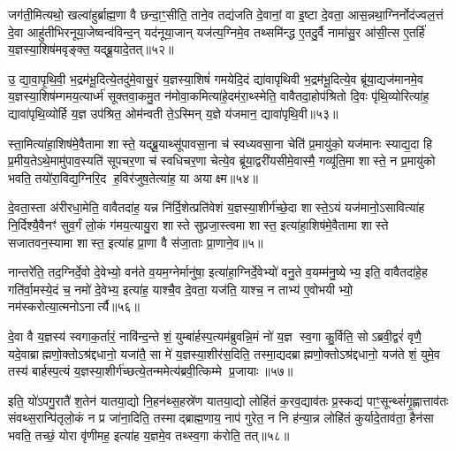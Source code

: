 जग॑ती॒मित्यथो॒ खल्वा॑हुर्ब्राह्म॒णा वै छन्दा॒ꣳ॒सीति॒ ताने॒व तद्य॑जति दे॒वानां॒ वा इ॒ष्टा दे॒वता॒ आस॒न्नथा॒ग्निर्नोद॑ज्वल॒त्तं दे॒वा आहु॑तीभिरनूया॒जेष्वन्व॑विन्द॒न् यद॑नूया॒जान् यज॑त्य॒ग्निमे॒व तथ्समि॑न्द्ध ए॒तदु॒र्वै नामा॑सु॒र आ॑सी॒त्स ए॒तर्\mbox{}हि॑ य॒ज्ञस्या॒शिष॑मवृङ्क्त॒ यद्ब्रू॒यादे॒तत्॥५२॥

उ॒ द्या॒वा॒पृ॒थि॒वी॒ भ॒द्रम॑भू॒दित्ये॒तदु॑मे॒वासु॒रं य॒ज्ञस्या॒शिषं॑ गमयेदि॒दं द्या॑वापृथिवी भ॒द्रम॑भू॒दित्ये॒व ब्रू॑या॒द्यज॑मानमे॒व य॒ज्ञस्या॒शिष॑म्गमय॒त्यार्ध्म॑ सूक्तवा॒कमु॒त न॑मोवा॒कमित्या॑हे॒दम॑रा॒थ्स्मेति॒ वावैतदा॒होप॑श्रितो दि॒वः पृ॑थि॒व्योरित्या॑ह॒ द्यावा॑पृथि॒व्योर्\mbox{}हि य॒ज्ञ उप॑श्रित॒ ओम॑न्वती ते॒ऽस्मिन् य॒ज्ञे य॑जमान॒ द्यावा॑पृथि॒वी॥५३॥

स्ता॒मित्या॑हा॒शिष॑मे॒वैतामा शास्ते॒ यद्ब्रू॒याथ्सू॑पावसा॒ना च॑ स्वध्यवसा॒ना चेति॑ प्र॒मायु॑को॒ यज॑मानः स्याद्य॒दा हि प्र॒मीय॒तेऽथे॒मामु॑पाव॒स्यति॑ सूपचर॒णा च॑ स्वधिचर॒णा चेत्ये॒व ब्रू॑या॒द्वरी॑यसीमे॒वास्मै॒ गव्यू॑ति॒मा शास्ते॒ न प्र॒मायु॑को भवति॒ तयो॑रा॒विद्य॒ग्निरि॒द ह॒विर॑जुष॒तेत्या॑ह॒ या अयाक्ष्म॥५४॥

दे॒वता॒स्ता अ॑रीरधा॒मेति॒ वावैतदा॑ह॒ यन्न नि॑र्दि॒शेत्प्रति॑वेशं य॒ज्ञस्या॒शीर्ग॑च्छे॒दा शास्ते॒ऽयं यज॑मानो॒ऽसावित्या॑ह नि॒र्दिश्यै॒वैनꣳ॑ सुव॒र्गं लो॒कं ग॑मय॒त्यायु॒रा शास्ते सुप्रजा॒स्त्वमा शास्त॒ इत्या॑हा॒शिष॑मे॒वैतामा शास्ते सजातवन॒स्यामा शास्त॒ इत्या॑ह प्रा॒णा वै स॑जा॒ताः प्रा॒णाने॒व॥५॥

नान्तरे॑ति॒ तद॒ग्निर्दे॒वो दे॒वेभ्यो॒ वन॑ते व॒यम॒ग्नेर्मानु॑षा॒ इत्या॑हा॒ग्निर्दे॒वेभ्यो॑ वनु॒ते व॒यम्म॑नु॒ष्येभ्य॒ इति॒ वावैतदा॑हे॒ह गति॑र्वा॒मस्ये॒दं च॒ नमो॑ दे॒वेभ्य॒ इत्या॑ह॒ याश्चै॒व दे॒वता॒ यज॑ति॒ याश्च॒ न ताभ्य॑ ए॒वोभयीभ्यो॒ नम॑स्करोत्या॒त्मनोऽनार्त्यै॥५६॥

{\anuvakamend[{श्रि॒तस्ते॒ प्र त्रि॒ष्टुभ॑मे॒तद्द्यावा॑पृथि॒वी या अयाक्ष्म प्रा॒णाने॒व षट्च॑त्वारिशच्च॥९॥}]}

दे॒वा वै य॒ज्ञस्य॑ स्वगाक॒र्तारं॒ नावि॑न्द॒न्ते शं॒ युम्बा॑र्\mbox{}हस्प॒त्यम॑ब्रुवन्नि॒मं नो॑ य॒ज्ञ स्व॒गा कु॒र्विति॒ सोऽब्रवी॒द्वरं॑ वृणै॒ यदे॒वाब्राह्मणो॒क्तोऽश्र॑द्दधानो॒ यजा॑तै॒ सा मे॑ य॒ज्ञस्या॒शीर॑स॒दिति॒ तस्मा॒द्यदब्राह्मणो॒क्तोऽश्र॑द्दधानो॒ यज॑ते शं॒ युमे॒व तस्य॑ बार्\mbox{}हस्प॒त्यं य॒ज्ञस्या॒शीर्ग॑च्छत्ये॒तन्ममेत्य॑ब्रवी॒त्किम्मे प्र॒जायाः॥५७॥

इति॒ यो॑ऽपगु॒रातै॑ श॒तेन॑ यातया॒द्यो नि॒हन॑थ्स॒हस्रे॑ण यातया॒द्यो लोहि॑तं क॒रव॒द्याव॑तः प्र॒स्कद्य॑ पाꣳ॒सून्थ्सं॑गृ॒ह्णात्ताव॑तः संवथ्स॒रान्पि॑तृलो॒कं न प्र जा॑ना॒दिति॒ तस्माद्ब्राह्म॒णाय॒ नाप॑ गुरेत॒ न नि ह॑न्या॒न्न लोहि॑तं कुर्यादे॒ताव॑ता॒ हैन॑सा भवति॒ तच्छं॒ योरा वृ॑णीमह॒ इत्या॑ह य॒ज्ञमे॒व तथ्स्व॒गा क॑रोति॒ तत्॥५८॥

